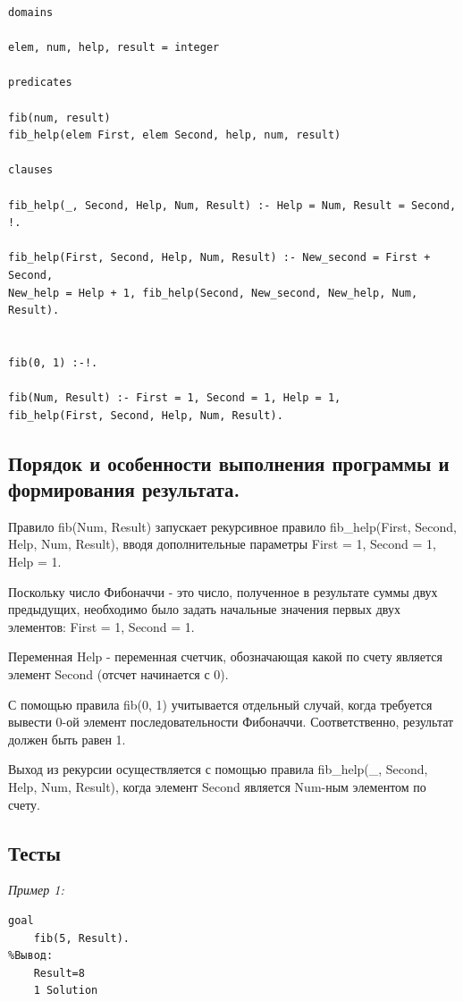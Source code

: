 \documentclass[a4paper,12pt]{article}
\begin{document}
	\begin{verbatim}
domains

elem, num, help, result = integer

predicates

fib(num, result)
fib_help(elem First, elem Second, help, num, result)

clauses

fib_help(_, Second, Help, Num, Result) :- Help = Num, Result = Second, !.

fib_help(First, Second, Help, Num, Result) :- New_second = First + Second,
New_help = Help + 1, fib_help(Second, New_second, New_help, Num, Result).


fib(0, 1) :-!.

fib(Num, Result) :- First = 1, Second = 1, Help = 1, 
fib_help(First, Second, Help, Num, Result).
	\end{verbatim}
	
	\subsection*{Порядок и особенности выполнения программы и формирования результата.}
	
	Правило fib(Num, Result) запускает рекурсивное правило fib\_help(First, Second, Help, Num, Result), вводя дополнительные параметры First = 1, Second = 1, Help = 1.
	
	Поскольку число Фибоначчи - это число, полученное в результате суммы двух предыдущих, необходимо было задать начальные значения первых двух элементов: First = 1, Second = 1.
	
	Переменная Help - переменная счетчик, обозначающая какой по счету является элемент Second (отсчет начинается с 0).
	
	С помощью правила fib(0, 1) учитывается отдельный случай, когда требуется вывести 0-ой элемент последовательности Фибоначчи. Соответственно, результат должен быть равен 1.
	
	Выход из рекурсии осуществляется с помощью правила fib\_help(\_, Second, Help, Num, Result), когда элемент Second является Num-ным элементом по счету.
	
	\subsection*{Тесты}
	
	\textit{Пример 1:}
	
	\begin{verbatim}
goal
	fib(5, Result).
%Вывод:
	Result=8
	1 Solution
	\end{verbatim}
	
\end{document}
